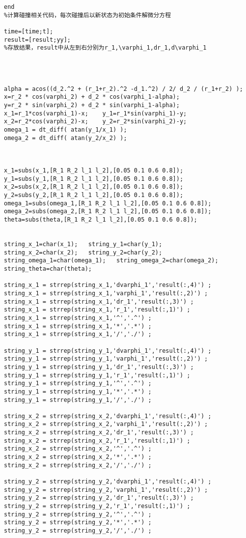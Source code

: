 \documentclass[a4paper,c5size,twoside,UTF8]{ctexart} %
\numberwithin{equation}{section}   %
\begin{document}
\begin{lstlisting}
end
%计算碰撞相关代码，每次碰撞后以新状态为初始条件解微分方程

time=[time;t];
result=[result;yy];
%存放结果，result中从左到右分别为r_1,\varphi_1,dr_1,d\varphi_1




alpha = acos((d_2.^2 + (r_1+r_2).^2 -d_1.^2) / 2/ d_2 / (r_1+r_2) );
x=r_2 * cos(varphi_2) + d_2 * cos(varphi_1-alpha);
y=r_2 * sin(varphi_2) + d_2 * sin(varphi_1-alpha);
x_1=r_1*cos(varphi_1)-x;    y_1=r_1*sin(varphi_1)-y;
x_2=r_2*cos(varphi_2)-x;    y_2=r_2*sin(varphi_2)-y;
omega_1 = dt_diff( atan(y_1/x_1) );
omega_2 = dt_diff( atan(y_2/x_2) );



x_1=subs(x_1,[R_1 R_2 l_1 l_2],[0.05 0.1 0.6 0.8]);
y_1=subs(y_1,[R_1 R_2 l_1 l_2],[0.05 0.1 0.6 0.8]);
x_2=subs(x_2,[R_1 R_2 l_1 l_2],[0.05 0.1 0.6 0.8]);
y_2=subs(y_2,[R_1 R_2 l_1 l_2],[0.05 0.1 0.6 0.8]);
omega_1=subs(omega_1,[R_1 R_2 l_1 l_2],[0.05 0.1 0.6 0.8]);
omega_2=subs(omega_2,[R_1 R_2 l_1 l_2],[0.05 0.1 0.6 0.8]);
theta=subs(theta,[R_1 R_2 l_1 l_2],[0.05 0.1 0.6 0.8]);


string_x_1=char(x_1);   string_y_1=char(y_1);   
string_x_2=char(x_2);   string_y_2=char(y_2);
string_omega_1=char(omega_1);   string_omega_2=char(omega_2);
string_theta=char(theta);   

string_x_1 = strrep(string_x_1,'dvarphi_1','result(:,4)') ;
string_x_1 = strrep(string_x_1,'varphi_1','result(:,2)') ;
string_x_1 = strrep(string_x_1,'dr_1','result(:,3)') ;
string_x_1 = strrep(string_x_1,'r_1','result(:,1)') ;
string_x_1 = strrep(string_x_1,'^','.^') ;
string_x_1 = strrep(string_x_1,'*','.*') ;
string_x_1 = strrep(string_x_1,'/','./') ;

string_y_1 = strrep(string_y_1,'dvarphi_1','result(:,4)') ;
string_y_1 = strrep(string_y_1,'varphi_1','result(:,2)') ;
string_y_1 = strrep(string_y_1,'dr_1','result(:,3)') ;
string_y_1 = strrep(string_y_1,'r_1','result(:,1)') ;
string_y_1 = strrep(string_y_1,'^','.^') ;
string_y_1 = strrep(string_y_1,'*','.*') ;
string_y_1 = strrep(string_y_1,'/','./') ;

string_x_2 = strrep(string_x_2,'dvarphi_1','result(:,4)') ;
string_x_2 = strrep(string_x_2,'varphi_1','result(:,2)') ;
string_x_2 = strrep(string_x_2,'dr_1','result(:,3)') ;
string_x_2 = strrep(string_x_2,'r_1','result(:,1)') ;
string_x_2 = strrep(string_x_2,'^','.^') ;
string_x_2 = strrep(string_x_2,'*','.*') ;
string_x_2 = strrep(string_x_2,'/','./') ;

string_y_2 = strrep(string_y_2,'dvarphi_1','result(:,4)') ;
string_y_2 = strrep(string_y_2,'varphi_1','result(:,2)') ;
string_y_2 = strrep(string_y_2,'dr_1','result(:,3)') ;
string_y_2 = strrep(string_y_2,'r_1','result(:,1)') ;
string_y_2 = strrep(string_y_2,'^','.^') ;
string_y_2 = strrep(string_y_2,'*','.*') ;
string_y_2 = strrep(string_y_2,'/','./') ;


\end{lstlisting}
\end{document}
